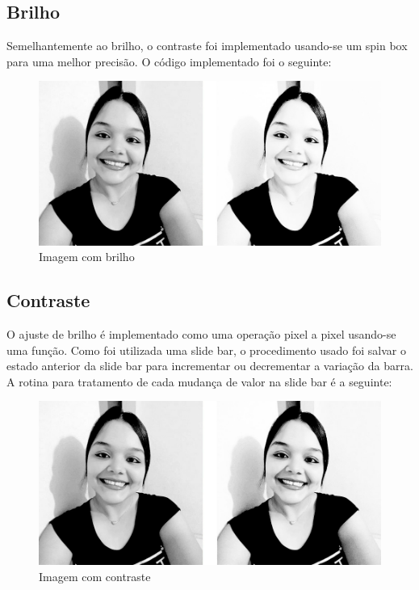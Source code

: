 		\lstset{language=c++}
		{\tiny }
		
	\subsection{Brilho}
		Semelhantemente ao brilho, o contraste foi implementado usando-se um spin box para uma melhor precisão. O código implementado foi o seguinte:
		
		\begin{figure}[!htb]
			\centering
			\includegraphics[width=\textwidth]{img/08-brilho.jpg}
			\caption{Imagem com brilho}
		\end{figure}
	
		\lstset{language=c++}
		{\tiny }
		
	\subsection{Contraste}
		O ajuste de brilho é implementado como uma operação pixel a pixel usando-se uma função. Como foi utilizada uma slide bar, o procedimento usado foi salvar o estado anterior da slide bar para incrementar ou decrementar a variação da barra. A rotina para tratamento de cada mudança de valor na slide bar é a seguinte:
		
		\begin{figure}[!htb]
			\centering
			\includegraphics[width=\textwidth]{img/09-contraste.jpg}
			\caption{Imagem com contraste}
		\end{figure}
		
